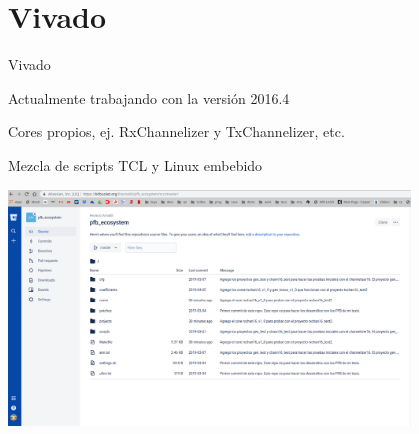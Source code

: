 \documentclass[ignorenonframetext,12pt]{beamer}
\begin{document}
\section{Vivado}
\begin{frame}{Vivado}

        Actualmente trabajando con la versi\'on 2016.4

        Cores propios, ej. RxChannelizer y TxChannelizer, etc.

        Mezcla de scripts TCL y Linux embebido
        \begin{center}
                \includegraphics[width=0.8\textwidth]{pfb_repo}
        \end{center}
\end{frame}
\end{document}
